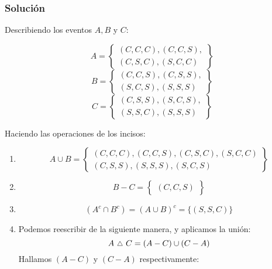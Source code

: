 \begin{enumerate}
\subsubsection{Solución}
Describiendo los eventos $A,B$ y $C$:
\begin{multicols}{3}
\noindent
\begin{equation*}
A=
\left\lbrace 
\begin{aligned}
(C,C,C),(C,C,S), \\
(C,S,C),(S,C,C)
\end{aligned}
\right\rbrace 
\end{equation*}
\columnbreak
\begin{equation*}
B=
\left\lbrace 
\begin{aligned}
(C,C,S),(C,S,S),\\
(S,C,S),(S,S,S)
\end{aligned}
\right\rbrace 
\end{equation*}
\columnbreak
\begin{equation*}
C=
\left\lbrace 
\begin{aligned}
(C,S,S),(S,C,S),\\
(S,S,C),(S,S,S)
\end{aligned}
\right\rbrace 
\end{equation*}
\end{multicols}
Haciendo las operaciones de los incisos:
\begin{enumerate}
\item \begin{equation*}
A\cup B=
\left\lbrace 
\begin{aligned}
(C,C,C),(C,C,S),(C,S,C),(S,C,C) \\ 
(C,S,S),(S,S,S),(S,C,S)
\end{aligned}
\right\rbrace 
\end{equation*}
\item \begin{equation*}
B-C=
\left\lbrace 
\begin{aligned}
(C,C,S)
\end{aligned}
\right\rbrace 
\end{equation*}
\item 
\begin{equation*}
(A^c \cap B^c)=(A\cup B)^c = \{ (S,S,C) \}
\end{equation*}
\item Podemos reescribir de la siguiente manera, y aplicamos la unión:
$$
\text{$A$ {\footnotesize $\triangle$} $C$} = (A-C)\cup (C-A)
$$
Hallamos $(A-C)$ y $(C-A)$ respectivamente:

\end{enumerate}
\end{enumerate}
